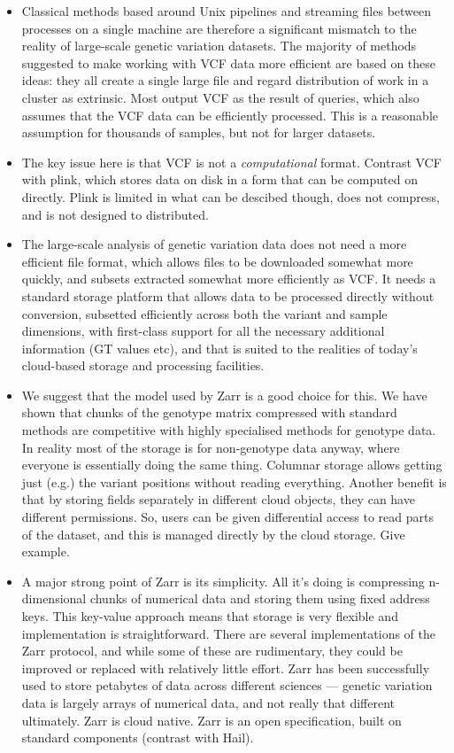 \documentclass[a4paper,num-refs]{oup-contemporary}
\begin{document}
\begin{itemize}
\item Classical methods based around Unix pipelines and streaming
files between processes on a single machine are therefore a
significant mismatch to the reality of large-scale genetic variation
datasets. The majority of methods suggested to make working
with VCF data more efficient are based on these ideas: they all
create a single large file and regard distribution of work
in a cluster as extrinsic. Most output VCF as the result of queries,
which also assumes that the VCF data can be efficiently processed.
This is a reasonable assumption for thousands of samples, but not
for larger datasets.

\item The key issue here is that VCF is not a \emph{computational}
format. Contrast VCF with plink, which stores data on disk in a
form that can be computed on directly. Plink is limited in what
can be descibed though, does not compress, and is not designed
to distributed.

\item The large-scale analysis of genetic variation data does not
need a more efficient file format, which allows files to be downloaded
somewhat more quickly, and subsets extracted somewhat more efficiently
as VCF. It needs a standard storage platform that allows data to be
processed directly without conversion, subsetted efficiently across
both the variant and sample dimensions, with first-class support
for all the necessary additional information (GT values etc),
and that is suited to the realities of today's cloud-based
storage and processing facilities.

\item We suggest that the model used by Zarr is a good choice for this.
We have shown that chunks of the genotype matrix compressed with standard
methods are competitive with highly specialised methods for
genotype data. In reality most of the storage is for non-genotype
data anyway, where everyone is essentially doing the same thing.
Columnar storage allows getting just (e.g.) the variant positions
without reading everything. Another benefit is that by storing
fields separately in different cloud objects, they can have
different permissions. So, users can be given differential access
to read parts of the dataset, and this is managed directly
by the cloud storage. Give example.

\item A major strong point of Zarr is its simplicity. All it's doing
is compressing n-dimensional chunks of numerical data and storing
them using fixed address keys. This key-value approach means that storage
is very flexible and implementation is straightforward. There
are several implementations of the Zarr protocol, and while some of these
are rudimentary, they could be improved or replaced with relatively
little effort. Zarr has been successfully used to store petabytes
of data across different sciences --- genetic variation data is largely
arrays of numerical data, and not really that different ultimately.
Zarr is cloud native.
Zarr is an open specification, built on standard components (contrast
with Hail).


\end{itemize}
\end{document}
